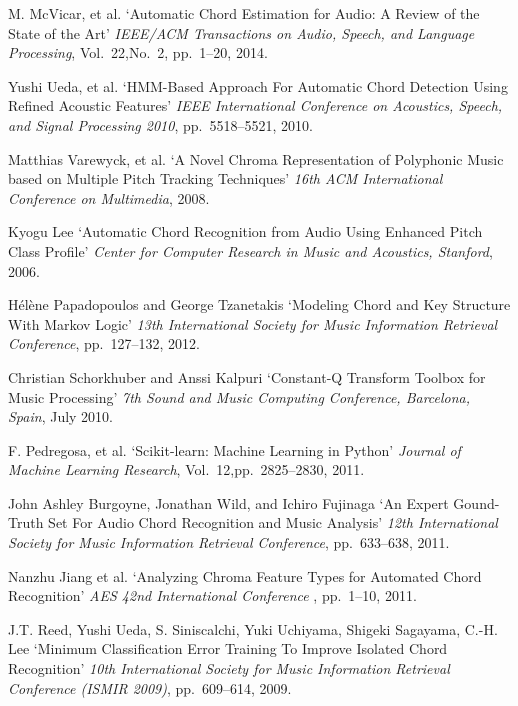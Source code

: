 \documentclass{article}
\begin{document}
\begin{thebibliography}{citations}

M. McVicar, et al.
`Automatic Chord Estimation for Audio: A Review of the State of the Art'
{\it IEEE/ACM Transactions on Audio, Speech, and Language Processing},
Vol.~22,No.~2, pp.~1--20, 2014.

Yushi Ueda, et al.
`HMM-Based Approach For Automatic Chord Detection Using Refined Acoustic Features'
{\it IEEE International Conference on Acoustics, Speech, and Signal Processing 2010},
pp.~5518--5521, 2010.

Matthias Varewyck, et al.
`A Novel Chroma Representation of Polyphonic Music based on Multiple Pitch
Tracking Techniques'
{\it 16th ACM International Conference on Multimedia},
2008.

Kyogu Lee
`Automatic Chord Recognition from Audio Using Enhanced Pitch Class Profile'
{\it Center for Computer Research in Music and Acoustics, Stanford},
2006.

Hélène Papadopoulos and George Tzanetakis
`Modeling Chord and Key Structure With Markov Logic'
{\it 13th International Society for Music Information Retrieval Conference},
pp.~127--132, 2012.

Christian Schorkhuber and Anssi Kalpuri
`Constant-Q Transform Toolbox for Music Processing'
{\it 7th Sound and Music Computing Conference, Barcelona, Spain},
July 2010.

F. Pedregosa, et al.
`Scikit-learn: Machine Learning in Python'
{\it Journal of Machine Learning Research},
Vol.~12,pp.~2825--2830, 2011.

John Ashley Burgoyne, Jonathan Wild, and Ichiro Fujinaga
`An Expert Gound-Truth Set For Audio Chord Recognition and Music Analysis'
{\it 12th International Society for Music Information Retrieval Conference},
pp.~633--638, 2011.

Nanzhu Jiang et al.
`Analyzing Chroma Feature Types for Automated Chord Recognition'
{\it AES 42nd International Conference },
pp.~1--10, 2011.

J.T. Reed, Yushi Ueda, S. Siniscalchi, Yuki Uchiyama, Shigeki Sagayama, C.-H. Lee
`Minimum Classification Error Training To Improve Isolated Chord Recognition'
{\it 10th International Society for Music Information Retrieval Conference (ISMIR 2009)},
pp.~609--614, 2009.


\end{thebibliography}
\end{document}
